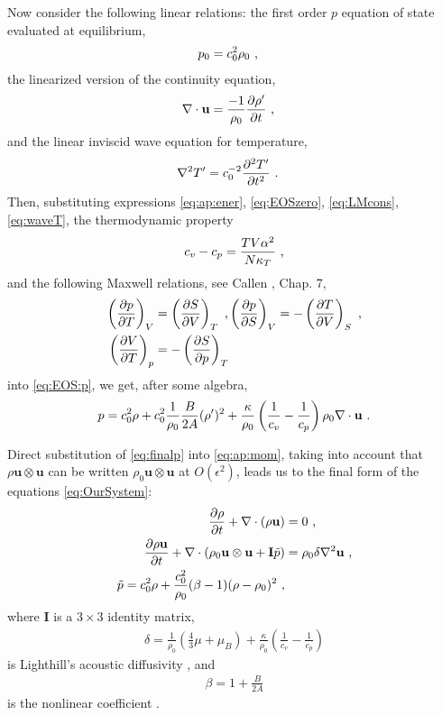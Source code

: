 Now consider the following linear relations: the first order $p$ equation of state evaluated at equilibrium,
\begin{align}
  \label{eq:EOSzero}
  p_0 &= c_0^2 \rho_0 
  \ \text{,}
\end{align}
the linearized version of the continuity equation,
\begin{align}
  \label{eq:LMcons}
  \nabla\cdot\mathbf{u} &= \frac{-1}{\rho_0}\frac{\partial \rho'}{\partial t}
  \ \text{,}
\end{align}
and the linear inviscid wave equation for temperature,
\begin{align}
  \label{eq:waveT}
  \nabla^2 T' &= c_0^{-2} \frac{\partial ^2T'}{\partial t^2} \ \text{.}
\end{align}
Then, substituting expressions \eqref{eq:ap:ener}, \eqref{eq:EOSzero}, \eqref{eq:LMcons}, \eqref{eq:waveT}, the thermodynamic property \citep{foot1}
\begin{align*}
  c_v - c_p = \frac{TV\alpha^2}{N\kappa_T}  
  \ \text{,}
\end{align*}
and the following Maxwell relations, see Callen \citep{callen2006thermodynamics}, Chap. 7,
\begin{align*} 
\left(\frac{\partial p}{\partial T}\right)_V &= \left(\frac{\partial S}{\partial V}\right)_T \ \text{,} 
\left(\frac{\partial p}{\partial S}\right)_V = -\left(\frac{\partial T}{\partial V}\right)_S \ \text{,} \\ 
\left(\frac{\partial V}{\partial T}\right)_p &= -\left(\frac{\partial S}{\partial p}\right)_T 
\end{align*}
into \eqref{eq:EOS:p}, we get, after some algebra,
\begin{align}
  \label{eq:finalp}
  p = c_0^2 \rho + c_0^2 \frac{1}{\rho_0} \frac{B}{2A}(\rho')^2 +
  \frac{\kappa}{\rho_0}
  \left(
    \frac{1}{c_v} - \frac{1}{c_p}
  \right)
  \rho_0 \nabla\cdot\mathbf{u}
  \ \text{.}
\end{align}

Direct substitution of \eqref{eq:finalp} into \eqref{eq:ap:mom}, taking into account that $\rho\mathbf{u}\otimes\mathbf{u}$ can be written $\rho_0\mathbf{u}\otimes\mathbf{u}$ at $O(\epsilon^2)$, leads us to the final form of the equations \eqref{eq:OurSystem}:
\begin{align*} 
  \frac{\partial \rho}{\partial t} + \nabla \cdot
  \left(\rho \mathbf{u}\right)& = 0 
  \ \text{,} \\ 
  \frac{\partial \rho \mathbf{u}}{\partial t} +
  \nabla\cdot\left(
    \rho_0 \mathbf{u}\otimes\mathbf{u} + \mathbf{I}\tilde{p}
  \right)
  &= 
  \rho_0 \delta \nabla^2 \mathbf{u}
  \ \text{,} \\
  \tilde{p} = 
  c_0^2 \rho + \frac{c_0^2}{\rho_0} (\beta-1)(\rho-\rho_0)^2 
  \ \text{,}
\end{align*}
where $\mathbf{I}$ is a $3\times 3$ identity matrix,
\begin{align}
\label{eq:def-delta}
  \delta = \frac{1}{\rho_0}
  \left(
    \frac{4}{3}
    \mu+\mu_B
  \right)
  +
  \frac{\kappa}{\rho_0}
  \left(
    \frac{1}{c_v}
    -\frac{1}{c_p}
  \right)
\end{align}
is Lighthill's  acoustic diffusivity \citep{lighthill}, and
\begin{align*}
  \beta = 1 + \frac{B}{2A}
\end{align*}
is the nonlinear coefficient \citep{beyer1998parameter}.

